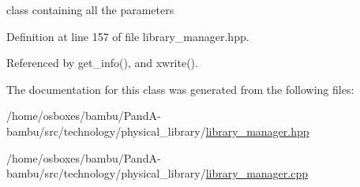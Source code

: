 class containing all the parameters 



Definition at line 157 of file library\+\_\+manager.\+hpp.



Referenced by get\+\_\+info(), and xwrite().



The documentation for this class was generated from the following files\+:\begin{DoxyCompactItemize}
\item 
/home/osboxes/bambu/\+Pand\+A-\/bambu/src/technology/physical\+\_\+library/\hyperlink{library__manager_8hpp}{library\+\_\+manager.\+hpp}\item 
/home/osboxes/bambu/\+Pand\+A-\/bambu/src/technology/physical\+\_\+library/\hyperlink{library__manager_8cpp}{library\+\_\+manager.\+cpp}\end{DoxyCompactItemize}
